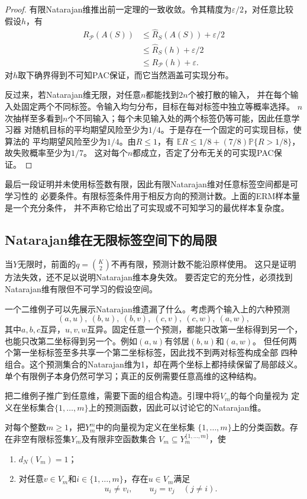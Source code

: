 \begin{proof}
有限Natarajan维推出前一定理的一致收敛。令其精度为$\varepsilon/2$，对任意比较
假设$h$，有
\begin{align*}
 R_{\mathcal P}(A(S))&\leq\hat R_S(A(S))+\varepsilon/2\\
 &\leq\hat R_S(h)+\varepsilon/2\\
 &\leq R_{\mathcal P}(h)+\varepsilon.
\end{align*}
对$h$取下确界得到不可知PAC保证，而它当然涵盖可实现分布。

反过来，若Natarajan维无限，对任意$n$都能找到$2n$个被打散的输入，
并在每个输入处固定两个不同标签。令输入均匀分布，目标在每对标签中独立等概率选择。
$n$次抽样至多看到$n$个不同输入；每个未见输入处的两个标签仍等可能，因此任意学习器
对随机目标的平均期望风险至少为$1/4$。于是存在一个固定的可实现目标，使算法的
平均期望风险至少为$1/4$。由$R\leq1$，有
$\mathbb E R\leq1/8+(7/8)\mathbb P\{R>1/8\}$，故失败概率至少为$1/7$。
这对每个$n$都成立，否定了分布无关的可实现PAC保证。
\end{proof}

最后一段证明并未使用标签数有限，因此有限Natarajan维对任意标签空间都是可学习性的
必要条件。有限标签条件用于相反方向的预测计数。上面的ERM样本量是一个充分条件，
并不声称它给出了可实现或不可知学习的最优样本复杂度。

\subsection{Natarajan维在无限标签空间下的局限}
\label{sec:multiclass-erm-limitations}

当$Y$无限时，前面的$q=\binom K2$不再有限，预测计数不能沿原样使用。
这只是证明方法失效，还不足以说明Natarajan维本身失效。
要否定它的充分性，必须找到Natarajan维有限但不可学习的假设空间。

一个二维例子可以先展示Natarajan维遗漏了什么。考虑两个输入上的六种预测
\[
 (a,u),\ (b,u),\ (b,v),\ (c,v),\ (c,w),\ (a,w),
\]
其中$a,b,c$互异，$u,v,w$互异。固定任意一个预测，都能只改第一坐标得到另一个，
也能只改第二坐标得到另一个。例如$(a,u)$有邻居$(b,u)$和$(a,w)$。
但任何两个第一坐标标签至多共享一个第二坐标标签，因此找不到两对标签构成全部
四种组合。这个预测集合的Natarajan维为1，却在两个坐标上都持续保留了局部歧义。
单个有限例子本身仍然可学习；真正的反例需要任意高维的这种结构。

把二维例子推广到任意维，需要下面的组合构造。引理中将$V_m$的每个向量视为
定义在坐标集合$\{1,\ldots,m\}$上的预测函数，因此可以讨论它的Natarajan维。

\begin{lemma}[低Natarajan维的局部邻接构造]
\label{lem:low-natarajan-pseudocubes}
对每个整数$m\geq1$，把$Y_m^m$中的向量视为定义在坐标集
$\{1,\ldots,m\}$上的分类函数。存在非空有限标签集$Y_m$及有限非空函数集合
$V_m\subseteq Y_m^{\{1,\ldots,m\}}$，使
\begin{enumerate}
 \item $d_N(V_m)=1$；
 \item 对任意$v\in V_m$和$i\in\{1,\ldots,m\}$，存在$u\in V_m$满足
 \[
 u_i\neq v_i,\qquad u_j=v_j\quad(j\neq i).
 \]
\end{enumerate}
\end{lemma}

